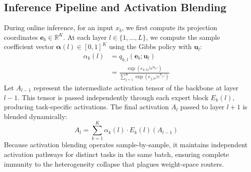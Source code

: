 \subsection{Inference Pipeline and Activation Blending}
During online inference, for an input $x_b$, we first compute its projection coordinates $\mathbf{e}_b \in \mathbb{R}^K$. At each layer $l \in \{1, \dots, L\}$, we compute the sample coefficient vector $\boldsymbol{\alpha}(l) \in [0, 1]^K$ using the Gibbs policy with $\mathbf{u}_l$:
\begin{equation}
\label{eq:gibbs_routing}
\begin{split}
\alpha_k(l) &= q_{k, l}(\mathbf{e}_b; \mathbf{u}_l) \\
&= \frac{\exp(e_{k, b} / e^{u_{k, l}})}{\sum_{j=1}^K \exp(e_{j, b} / e^{u_{j, l}})}
\end{split}
\end{equation}
Let $A_{l-1}$ represent the intermediate activation tensor of the backbone at layer $l-1$. This tensor is passed independently through each expert block $E_k(l)$, producing task-specific activations. The final activation $A_l$ passed to layer $l+1$ is blended dynamically:
\begin{equation}
\label{eq:activation_blending}
A_l = \sum_{k=1}^K \alpha_k(l) \cdot E_k(l)(A_{l-1})
\end{equation}
Because activation blending operates sample-by-sample, it maintains independent activation pathways for distinct tasks in the same batch, ensuring complete immunity to the heterogeneity collapse that plagues weight-space routers.

